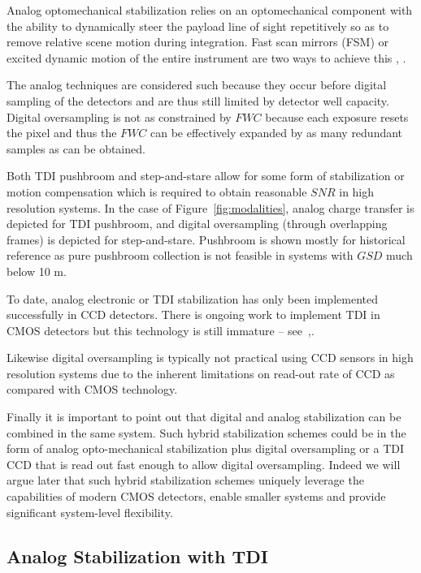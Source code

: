 \documentclass[10pt,journal]{IEEEtran}  %
\begin{document}
Analog optomechanical stabilization relies on an optomechanical component with the ability to dynamically steer the payload line of sight repetitively so as to remove relative scene motion during integration.  Fast scan mirrors (FSM) or excited dynamic motion of the entire instrument are two ways to achieve this \cite{patent:jonny}, \cite{patent:dirk}.

The analog techniques are considered such because they occur before digital sampling of the detectors and are thus still limited by detector well capacity.  Digital oversampling is not as constrained by $FWC$ because each exposure resets the pixel and thus the $FWC$ can be effectively expanded by as many redundant samples as can be obtained.

Both TDI pushbroom and step-and-stare allow for some form of stabilization or motion compensation which is required to obtain reasonable $SNR$ in high resolution systems.  In the case of Figure~\ref{fig:modalities}, analog charge transfer is depicted for TDI pushbroom, and digital oversampling (through overlapping frames) is depicted for step-and-stare.  Pushbroom is shown mostly for historical reference as pure pushbroom collection is not feasible in systems with $GSD$ much below 10 m.

To date, analog electronic or TDI stabilization has only been implemented successfully in CCD detectors.  There is ongoing work to implement TDI in CMOS detectors but this technology is still immature -- see~\cite{jerram},\cite{rushton}.

Likewise digital oversampling is typically not practical using CCD sensors in high resolution systems due to the inherent limitations on read-out rate of CCD as compared with CMOS technology.

Finally it is important to point out that digital and analog stabilization can be combined in the same system.  Such hybrid stabilization schemes could be in the form of analog opto-mechanical stabilization plus digital oversampling or a TDI CCD that is read out fast enough to allow digital oversampling.  Indeed we will argue later that such hybrid stabilization schemes uniquely leverage the capabilities of modern CMOS detectors, enable smaller systems and provide significant system-level flexibility.

\subsection{Analog Stabilization with TDI}
\end{document}
